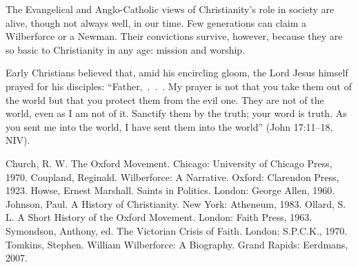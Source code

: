 The Evangelical and Anglo-Catholic views of Christianity’s role in society are alive, though not
always well, in our time. Few generations can claim a Wilberforce or a Newman. Their convictions
survive, however, because they are so basic to Christianity in any age: mission and worship.

Early Christians believed that, amid his encircling gloom, the Lord Jesus himself prayed for his
disciples: “Father,~.~.~. My prayer is not that you take them out of the world but that you protect
them from the evil one. They are not of the world, even as I am not of it. Sanctify them by the
truth; your word is truth. As you sent me into the world, I have sent them into the world” (John
17:11–18, NIV).

\begin{readinglist}
\entry Church, R. W. The Oxford Movement. Chicago: University of Chicago Press, 1970.
\entry Coupland, Reginald. Wilberforce: A Narrative. Oxford: Clarendon Press, 1923.
\entry Howse, Ernest Marshall. Saints in Politics. London: George Allen, 1960.
\entry Johnson, Paul. A History of Christianity. New York: Atheneum, 1983.
\entry Ollard, S. L. A Short History of the Oxford Movement. London: Faith Press, 1963.
\entry Symondson, Anthony, ed. The Victorian Crisis of Faith. London: S.P.C.K., 1970.
\entry *Tomkins, Stephen. William Wilberforce: A Biography. Grand Rapids: Eerdmans, 2007.
\end{readinglist}
